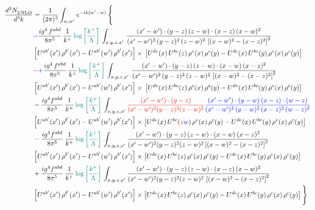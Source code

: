 \documentclass[9pt]{article}
\numberwithin{equation}{section}
\begin{document}
\begin{align}
   \frac{d^{3}N_{2\,\rm NLO}^{\rm}}{d^{3}k}  & = \frac{1}{(2\pi)^{3}}  \int_{w, w^\prime} e^{-ik(w^\prime-w)}\, \Bigg\{\notag \\ &  {\color{blue}-}\frac{ig^{4}\, f^{abd}}{8\pi^{5}}\, \frac{1}{k^{+}}\,{\color{teal}\log{\left[\frac{k^{+}}{\Lambda}\right]}}\, \int_{x,y,z,x'}\,\frac{(x'-w')\cdot  (y-z)\, (z-w)\cdot (x-z)\, (x-w)^{2}}{(x'-w')^{2}\, (y-z)^{2}\, (z-w)^{2}\,\left[(x-w)^{2}-(x-z)^{2}\right]^{2}}\, \notag \\ & \left[U^{ab'}(x')\,\rho^{b'}(x')-U^{ab'}(w')\, \rho^{b'}(x')\right]\times\,\left[U^{de}(x)\,U^{bc}(z)\, \rho^{e}(x)\,\rho^{c}(y)-U^{de}(x)\,U^{bc}(y)\,\rho^{e}(x)\,\rho^{c}(y)\right]\notag \\ &   {\color{red}-}{\color{blue}+} \frac{ig^{4}\, f^{abd}}{8\pi^{5}}\, \frac{1}{k^{+}}\,{\color{teal}\log{\left[\frac{k^{+}}{\Lambda}\right]}}\, \int_{x,y,z,x'}\,\frac{(x'-w')\cdot  (y-z)\, (z-w)\cdot (x-w)\, (x-z)^{2}}{(x'-w')^{2}\, (y-z)^{2}\, (z-w)^{2}\,\left[(x-w)^{2}-(x-z)^{2}\right]^{2}}\, \notag \\ & \left[U^{ab'}(x')\,\rho^{b'}(x')-U^{ab'}(w')\, \rho^{b'}(x')\right]\times\,\left[U^{de}(x)\,U^{bc}(z)\, \rho^{e}(x)\,\rho^{c}(y)-U^{de}(x)\,U^{bc}(y)\,\rho^{e}(x)\,\rho^{c}(y)\right]\notag \\ & -\frac{ig^{4}f^{abd}}{8\pi^{5}}\,\frac{1}{k^{+}}\,{\color{teal}\log{\left[\frac{k^{+}}{\Lambda}\right]}}\,\int_{x,y,z,x'}
{\color{red}\frac{(x'-w')\cdot(y-z)}{(x'-w')^{2}(y-z)^{2}(z-w)^{2}}}{\color{blue}\frac{(x'-w')\cdot(y-w)\,(x-z)\cdot(w-z)}{(x'-w')^{2}\,(y-w)^{2}\,(x-z)^{2}\,(w-z)^{2}}}\notag \\ & \left[U^{ab'}(x')\,\rho^{b'}(x')-U^{ab'}(w')\, \rho^{b'}(x')\right]\times \left[U^{de}(x)\,U^{bc}({\color{red}z}{\color{blue}w})\, \rho^{e}(x)\,\rho^{c}(y)-U^{de}(x)\,U^{bc}(y)\,\rho^{e}(x)\,\rho^{c}(y)\right]\notag \\ & -\frac{ig^{4}f^{abd}}{8\pi^{5}}\,\frac{1}{k^{+}}\,{\color{teal}\log{\left[\frac{k^{+}}{\Lambda}\right]}}\,\int_{x,y,z,x'}
\frac{(x'-w')\cdot(y-z)\,(z-w)\cdot(x-w)\,(x-z)^{2}}{(x'-w')^{2}(y-z)^{2}(z-w)^{2}\left[(x-w)^{2}-(x-z)^{2}\right]^{2}}\notag \\ & \left[U^{ab'}(x')\,\rho^{b'}(x')-U^{ab'}(w')\, \rho^{b'}(x')\right]\times \left[U^{de}(x)\,U^{bc}(z)\, \rho^{e}(x)\,\rho^{c}(y)-U^{de}(x)\,U^{bc}(y)\,\rho^{e}(x)\,\rho^{c}(y)\right]\notag \\ & +\frac{ig^{4}f^{abd}}{8\pi^{5}}\,\frac{1}{k^{+}}\,{\color{teal}\log{\left[\frac{k^{+}}{\Lambda}\right]}}\,\int_{x,y,z,x'}
\frac{(x'-w')\cdot(y-z)\,(z-w)\cdot(x-z)\,(x-w)^{2}}{(x'-w')^{2}(y-z)^{2}(z-w)^{2}\,\left[(x-w)^{2}-(x-z)^{2}\right]^{2}}\notag \\ & \left[U^{ab'}(x')\,\rho^{b'}(x')-U^{ab'}(w')\, \rho^{b'}(x')\right]\times \left[U^{de}(x)\,U^{bc}(z)\, \rho^{e}(x)\,\rho^{c}(y)-U^{de}(x)\,U^{bc}(y)\,\rho^{e}(x)\,\rho^{c}(y)\right]\Bigg\} 
\end{align}   
\end{document}
